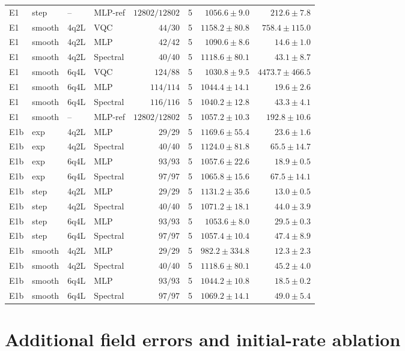 \documentclass[11pt]{article}
\begin{document}
\begin{longtable}{llllrrrr}
E1 & step & -- & MLP-ref & $12802/12802$ & 5 & $1056.6\pm9.0$ & $212.6\pm7.8$ \\
E1 & smooth & 4q2L & VQC & $44/30$ & 5 & $1158.2\pm80.8$ & $758.4\pm115.0$ \\
E1 & smooth & 4q2L & MLP & $42/42$ & 5 & $1090.6\pm8.6$ & $14.6\pm1.0$ \\
E1 & smooth & 4q2L & Spectral & $40/40$ & 5 & $1118.6\pm80.1$ & $43.1\pm8.7$ \\
E1 & smooth & 6q4L & VQC & $124/88$ & 5 & $1030.8\pm9.5$ & $4473.7\pm466.5$ \\
E1 & smooth & 6q4L & MLP & $114/114$ & 5 & $1044.4\pm14.1$ & $19.6\pm2.6$ \\
E1 & smooth & 6q4L & Spectral & $116/116$ & 5 & $1040.2\pm12.8$ & $43.3\pm4.1$ \\
E1 & smooth & -- & MLP-ref & $12802/12802$ & 5 & $1057.2\pm10.3$ & $192.8\pm10.6$ \\
\midrule
E1b & exp & 4q2L & MLP & $29/29$ & 5 & $1169.6\pm55.4$ & $23.6\pm1.6$ \\
E1b & exp & 4q2L & Spectral & $40/40$ & 5 & $1124.0\pm81.8$ & $65.5\pm14.7$ \\
E1b & exp & 6q4L & MLP & $93/93$ & 5 & $1057.6\pm22.6$ & $18.9\pm0.5$ \\
E1b & exp & 6q4L & Spectral & $97/97$ & 5 & $1065.8\pm15.6$ & $67.5\pm14.1$ \\
E1b & step & 4q2L & MLP & $29/29$ & 5 & $1131.2\pm35.6$ & $13.0\pm0.5$ \\
E1b & step & 4q2L & Spectral & $40/40$ & 5 & $1071.2\pm18.1$ & $44.0\pm3.9$ \\
E1b & step & 6q4L & MLP & $93/93$ & 5 & $1053.6\pm8.0$ & $29.5\pm0.3$ \\
E1b & step & 6q4L & Spectral & $97/97$ & 5 & $1057.4\pm10.4$ & $47.4\pm8.9$ \\
E1b & smooth & 4q2L & MLP & $29/29$ & 5 & $982.2\pm334.8$ & $12.3\pm2.3$ \\
E1b & smooth & 4q2L & Spectral & $40/40$ & 5 & $1118.6\pm80.1$ & $45.2\pm4.0$ \\
E1b & smooth & 6q4L & MLP & $93/93$ & 5 & $1044.2\pm10.8$ & $18.5\pm0.2$ \\
E1b & smooth & 6q4L & Spectral & $97/97$ & 5 & $1069.2\pm14.1$ & $49.0\pm5.4$ \\
\end{longtable}
\endgroup

\section{Additional field errors and initial-rate ablation}
\end{document}
